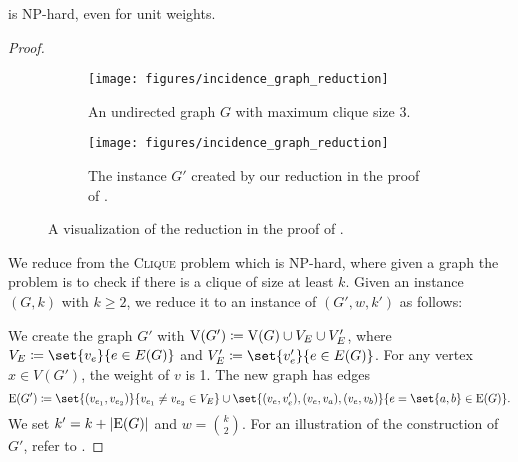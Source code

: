 \iflong
\begin{theorem}
\fi
\ifshort
\begin{theorem}[$\star$]
\fi
\label{thm:total_scc_np_hard}%
  \scs{} is NP-hard, even for unit weights.
\end{theorem}
\iflong
\begin{proof}
\begin{figure}
  \centering
  \hfill
  \begin{subfigure}{0.49\textwidth}
    \centering
    \texttt{[image: figures/incidence\_graph\_reduction]}
    \caption{An undirected graph $G$ with maximum clique size 3.}
  \end{subfigure}
  \hfill
  \begin{subfigure}{0.49\textwidth}
    \centering
    \texttt{[image: figures/incidence\_graph\_reduction]}
    \caption{The \scs{} instance $G'$ created by our reduction in the proof of . }
  \end{subfigure}
  \hfill
  \caption{A visualization of the reduction in the proof of . %
  }\label{fig:clique_reduction_scc}
\end{figure}

  We reduce from the \textsc{Clique} problem which is NP-hard, where given a graph the problem is to check if there is a clique of size at least $k$. Given an instance $(G,k)$ with $k\ge 2$, we reduce it to an instance of \scs{} $(G',w,k')$ as follows:
  
  We create the graph $G'$ with $\operatorname{V}({G'}) \coloneqq \operatorname{V}({G})\cup V_E \cup V_E'$, where $V_E \coloneqq \set{v_e}{e\in E(G)}$ and $V_E'\coloneqq \set{v_e'}{e\in E(G)}$. For any vertex $x\in V(G')$, the weight of $v$ is 1.
  The new graph has edges \[
  \e{G'} \coloneqq \set{(v_{e_1}, v_{e_2})}{v_{e_1} \ne v_{e_2} \in V_E} \cup \set{(v_e, v_e'), (v_e, v_a), (v_e, v_b)}{e = \set{a,b} \in \e{G}}.
  \] 
    We set $k' = k + \abs{\e{G}}$ and $w = \binom{k}{2}$. For an illustration of the construction of $G'$, refer to .
 

\end{proof}
\end{theorem}
